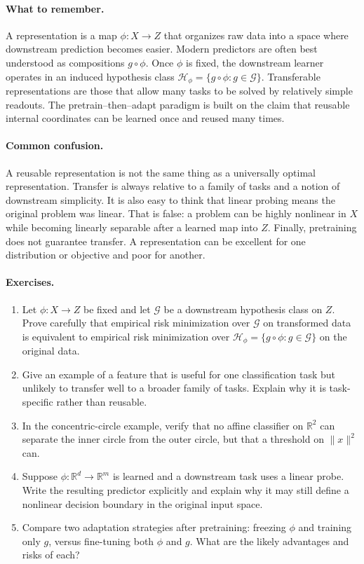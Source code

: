 \paragraph{What to remember.}
A representation is a map \(\phi : X \to Z\) that organizes raw data into a space where downstream prediction becomes easier.
Modern predictors are often best understood as compositions \(g \circ \phi\).
Once \(\phi\) is fixed, the downstream learner operates in an induced hypothesis class \(\mathcal{H}_{\phi} = \{g \circ \phi : g \in \mathcal{G}\}\).
Transferable representations are those that allow many tasks to be solved by relatively simple readouts.
The pretrain--then--adapt paradigm is built on the claim that reusable internal coordinates can be learned once and reused many times.

\paragraph{Common confusion.}
A reusable representation is not the same thing as a universally optimal representation.
Transfer is always relative to a family of tasks and a notion of downstream simplicity.
It is also easy to think that linear probing means the original problem was linear.
That is false:
a problem can be highly nonlinear in \(X\) while becoming linearly separable after a learned map into \(Z\).
Finally, pretraining does not guarantee transfer.
A representation can be excellent for one distribution or objective and poor for another.

\paragraph{Exercises.}
\begin{enumerate}
    \item Let \(\phi : X \to Z\) be fixed and let \(\mathcal{G}\) be a downstream hypothesis class on \(Z\).
    Prove carefully that empirical risk minimization over \(\mathcal{G}\) on transformed data is equivalent to empirical risk minimization over \(\mathcal{H}_{\phi} = \{g \circ \phi : g \in \mathcal{G}\}\) on the original data.
    \item Give an example of a feature that is useful for one classification task but unlikely to transfer well to a broader family of tasks.
    Explain why it is task-specific rather than reusable.
    \item In the concentric-circle example, verify that no affine classifier on \(\mathbb{R}^2\) can separate the inner circle from the outer circle, but that a threshold on \(\|x\|^2\) can.
    \item Suppose \(\phi : \mathbb{R}^d \to \mathbb{R}^m\) is learned and a downstream task uses a linear probe.
    Write the resulting predictor explicitly and explain why it may still define a nonlinear decision boundary in the original input space.
    \item Compare two adaptation strategies after pretraining: freezing \(\phi\) and training only \(g\), versus fine-tuning both \(\phi\) and \(g\).
    What are the likely advantages and risks of each?
\end{enumerate}

